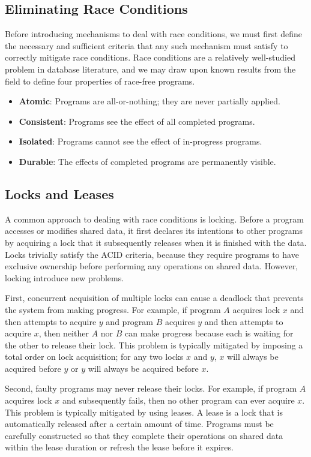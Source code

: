 \documentclass[12pt]{article}
\begin{document}
\subsection{Eliminating Race Conditions}
Before introducing mechanisms to deal with race conditions, we must first define the necessary and
sufficient criteria that any such mechanism must satisfy to correctly mitigate race conditions.
Race conditions are a relatively well-studied problem in database literature, and we may draw upon
known results from the field to define four properties of race-free programs. \cite{transactions}

\begin{itemize}
\item \textbf{Atomic}: Programs are all-or-nothing; they are never partially applied.
\item \textbf{Consistent}: Programs see the effect of all completed programs.
\item \textbf{Isolated}: Programs cannot see the effect of in-progress programs.
\item \textbf{Durable}: The effects of completed programs are permanently visible.
\end{itemize}

\subsection{Locks and Leases}
A common approach to dealing with race conditions is locking. Before a program accesses or
modifies shared data, it first declares its intentions to other programs by acquiring a
lock that it subsequently releases when it is finished with the data. Locks trivially satisfy
the ACID criteria, because they require programs to have exclusive ownership before performing any
operations on shared data. However, locking introduce new problems.

First, concurrent acquisition of multiple locks can cause a deadlock that prevents the system from
making progress. For example, if program $A$ acquires lock $x$ and then attempts to acquire $y$
and program $B$ acquires $y$ and then attempts to acquire $x$, then neither $A$ nor $B$ can make
progress because each is waiting for the other to release their lock. This problem is typically
mitigated by imposing a total order on lock acquisition; for any two locks $x$ and $y$, $x$ will
always be acquired before $y$ or $y$ will always be acquired before $x$.

Second, faulty programs may never release their locks. For example, if program $A$ acquires lock
$x$ and subsequently fails, then no other program can ever acquire $x$. This problem is typically
mitigated by using leases. \cite{leases} A lease is a lock that is automatically released after a
certain amount of time. Programs must be carefully constructed so that they complete their
operations on shared data within the lease duration or refresh the lease before it expires.
\end{document}
